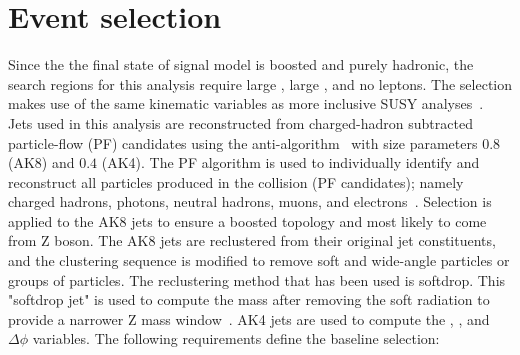 \section{Event selection}
\label{sec:event-selection}
Since the the final state of signal model is boosted and purely hadronic, the search regions for this analysis require large \MET, large \HT, and no leptons.
The selection makes use of the same kinematic variables as more inclusive SUSY analyses~\cite{RA2b:Moriond}.
Jets used in this analysis are reconstructed from charged-hadron subtracted particle-flow (PF) candidates using the anti-\kt algorithm~\cite{Cacciari:2008gp} with size parameters $0.8$ (AK8) and $0.4$ (AK4).
The PF algorithm is used to individually identify and reconstruct all particles produced in the collision (PF candidates); namely charged hadrons, photons, neutral hadrons, muons, and electrons~\cite{PF}.
Selection is applied to the AK8 jets to ensure a boosted topology and most likely to come from Z boson.
The AK8 jets are reclustered from their original jet constituents, and the clustering sequence is modified to remove soft and wide-angle particles or groups of particles. The reclustering method that has been used is softdrop.
This "softdrop jet" is used to compute the mass after removing the soft radiation to provide a narrower Z mass window~\cite{JetSub:Prune}. 
AK4 jets are used to compute the \HT, \MHT, and $\Delta\phi$ variables. 
The following requirements define the baseline selection:

